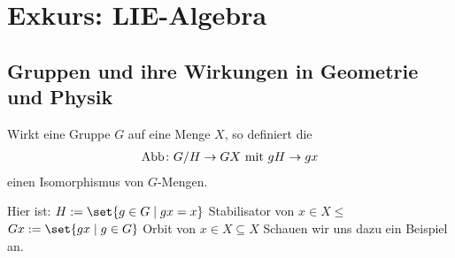 \section{Exkurs: LIE-Algebra}
\subsection{Gruppen und ihre Wirkungen in Geometrie und Physik}
\begin{proposition}
	Wirkt eine Gruppe $G$ auf eine Menge $X$, so definiert die 
	\begin{align*}
		\operatorname{Abb} \colon G/H \to GX \text{ mit } gH \to gx
	\end{align*}
	einen Isomorphismus von $G$-Mengen.
\end{proposition}
Hier ist: $H := \set{g \in G \mid gx = x}$ Stabilisator von $x \in X \leq$\\
$Gx := \set{gx \mid g \in G}$ Orbit von $x \in X \subseteq X$
Schauen wir uns dazu ein Beispiel an.
